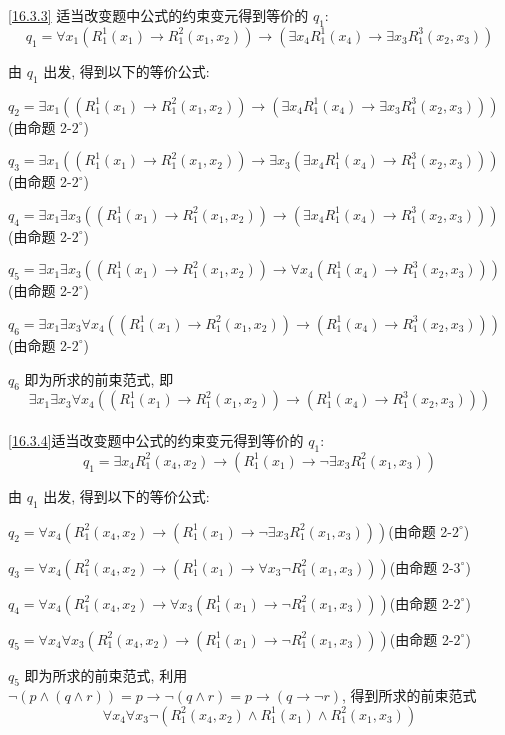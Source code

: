 \documentclass[boxes]{homework}
\begin{document}
\begin{solution}
    \ref{16.3.3} 适当改变题中公式的约束变元得到等价的 $q_1$:
    $$
        q_1 = \forall x_1(R_1^1(x_1)\to R_1^2(x_1, x_2))\to (\exists x_4 R_1^1(x_4)\to \exists x_3R_1^3(x_2, x_3))
    $$

    由 $q_1$ 出发, 得到以下的等价公式:

    $q_2=\exists x_1 ((R_1^1(x_1)\to R_1^2(x_1, x_2))\to (\exists x_4 R_1^1(x_4)\to \exists x_3R_1^3(x_2, x_3)))$\hfill (由命题 2-$2^\circ$)

    $q_3=\exists x_1 ((R_1^1(x_1)\to R_1^2(x_1, x_2))\to \exists x_3(\exists x_4 R_1^1(x_4)\to R_1^3(x_2, x_3)))$\hfill (由命题 2-$2^\circ$)

    $q_4=\exists x_1\exists x_3((R_1^1(x_1)\to R_1^2(x_1, x_2))\to(\exists x_4 R_1^1(x_4)\to R_1^3(x_2, x_3)))$\hfill (由命题 2-$2^\circ$)

    $q_5=\exists x_1\exists x_3((R_1^1(x_1)\to R_1^2(x_1, x_2))\to\forall x_4(R_1^1(x_4)\to R_1^3(x_2, x_3)))$\hfill (由命题 2-$2^\circ$)

    $q_6=\exists x_1\exists x_3\forall x_4((R_1^1(x_1)\to R_1^2(x_1, x_2))\to(R_1^1(x_4)\to R_1^3(x_2, x_3)))$\hfill (由命题 2-$2^\circ$)

    $q_6$ 即为所求的前束范式, 即
    $$
    \exists x_1\exists x_3\forall x_4((R_1^1(x_1)\to R_1^2(x_1, x_2))\to(R_1^1(x_4)\to R_1^3(x_2, x_3)))
    $$
    \\

    \ref{16.3.4}适当改变题中公式的约束变元得到等价的 $q_1$:
    $$
        q_1 = \exists x_4 R_1^2(x_4, x_2)\to (R_1^1(x_1)\to \lnot \exists x_3 R_1^2 (x_1, x_3))
    $$
    
    由 $q_1$ 出发, 得到以下的等价公式:

    $q_2=\forall x_4(R_1^2(x_4, x_2)\to (R_1^1(x_1)\to \lnot \exists x_3 R_1^2(x_1, x_3)))$\hfill (由命题 2-$2^\circ$)

    $q_3=\forall x_4(R_1^2(x_4, x_2)\to (R_1^1(x_1)\to \forall x_3 \lnot R_1^2(x_1, x_3)))$\hfill (由命题 2-$3^\circ$)

    $q_4=\forall x_4(R_1^2(x_4, x_2)\to \forall x_3 (R_1^1(x_1)\to \lnot R_1^2(x_1, x_3)))$\hfill (由命题 2-$2^\circ$)

    $q_5=\forall x_4\forall x_3 (R_1^2(x_4, x_2)\to (R_1^1(x_1)\to \lnot R_1^2(x_1, x_3)))$\hfill (由命题 2-$2^\circ$)

    $q_5$ 即为所求的前束范式, 利用 $\lnot(p\land (q\land r)) = p\to \lnot (q\land r)=p\to (q\to\lnot r)$, 得到所求的前束范式
    $$
        \forall x_4\forall x_3 \lnot(R_1^2(x_4, x_2)\land R_1^1(x_1)\land R_1^2(x_1, x_3))
    $$
\end{solution}
\end{document}
